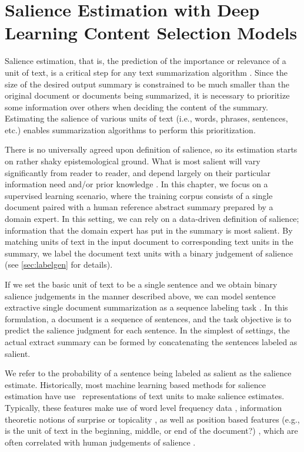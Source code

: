 \chapter{Salience Estimation with Deep Learning Content Selection Models}
\label{ch:dlsum}

Salience estimation, that is, the prediction of the importance or
relevance of a unit of text, is a critical step for any text summarization
algorithm \citep{nenkova2011}. Since the size of the desired output summary is
constrained to be much smaller than the original document or documents being
summarized, it is necessary to prioritize some information over others when
deciding the content of  the summary. Estimating the salience of various units
of text (i.e., words, phrases, sentences, etc.) enables summarization
algorithms to perform this prioritization.

There is no universally agreed upon definition of salience, so its estimation
starts on rather shaky epistemological ground. What is most salient will vary
significantly from reader to reader, and depend largely on their particular
information need and/or prior knowledge \citep{jones1999}.  In this chapter, we
focus on a supervised learning scenario, where the training corpus consists of
a single document paired with a human reference abstract summary prepared by a
domain expert. In this setting,  we can rely on a data-driven definition of
salience; information that the domain expert has put in the summary is most
salient.  By matching units of text in the input document to corresponding text
units in the summary, we label the document text units with a binary judgement
of salience (see \autoref{sec:labelgen} for details). 

If we set the basic unit of text to be a single sentence and we obtain binary
salience judgements in the manner described above, we can model sentence
extractive single document summarization as a sequence labeling task
\citep{conroy2001}. In this formulation, a document is a sequence of sentences,
and the task objective is to predict the salience judgment for each sentence.
In the simplest of settings, the actual extract summary can be formed by
concatenating the sentences labeled as salient.

We refer to the probability of a sentence being labeled as salient as the
salience estimate.  Historically, most machine learning based methods for
salience estimation have use \featurebased~representations of text units to
make salience estimates. Typically, these features make use of word level
frequency data \citep{nenkova2005}, information theoretic notions of surprise
or topicality \citep{lin2000,daume2006,louis2013,louis2014}, as well as
position based features (e.g., is the unit of text in the beginning, middle, or
end of the document?) \citep{kupiec1995trainable,radev2000,conroy2001}, which
are often correlated with human judgements of salience \citep{nenkova2005b}.

